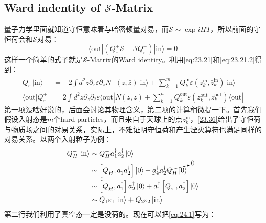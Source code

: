 \subsection{Ward indentity of $\mathcal{S}$\mbox{-}Matrix}
量子力学里面就知道守恒意味着与哈密顿量对易，而$\mathcal{S}\sim \exp{iHT}$，所以前面的守恒荷会和$\mathcal{S}$对易：
\begin{equation}\label{eq:24.1}
	\boxed{\langle\mathrm{out}|\left(Q_\varepsilon^+\mathcal{S}-\mathcal{S}Q_\varepsilon^-\right)|\mathrm{in}\rangle=0}
\end{equation}
这样一个简单的式子就是$\mathcal{S}$\mbox{-}Matrix的Ward identity。利用\ref{eq:23.21}和\ref{eq:23.21.2}得到：
\begin{equation}\label{eq:24.2}
	\begin{aligned}
		Q_\varepsilon^-|\mathrm{in}\rangle&=-2\int d^2z\partial_{\bar{z}}\varepsilon\partial_zN^-(z,\bar{z})|\mathrm{in}\rangle+\sum_{k=1}^mQ_k^\mathrm{in}\varepsilon(z_k^\mathrm{in},\bar{z}_k^\mathrm{in})|\mathrm{in}\rangle \\
		\langle\mathrm{out}|Q_\varepsilon^+&=2\int d^2z\partial_z\partial_{\bar{z}}\varepsilon\langle\mathrm{out}|N(z,\bar{z})+\sum_{k=1}^nQ_k^\mathrm{out}\varepsilon(z_k^\mathrm{out},\bar{z}_k^\mathrm{out})\langle\mathrm{out}|
	\end{aligned}
\end{equation}
第一项没啥好说的，后面会讨论其物理含义，第二项的计算稍微提一下。首先我们假设入射态是$m$个hard particles，而且来自于天球上的点$z_k^{\mathrm{in}}$，\ref{23.36}给出了守恒荷与物质场之间的对易关系，实际上，不难证明守恒荷和产生湮灭算符也满足同样的对易关系。以两个入射粒子为例：
\begin{equation}
	\begin{aligned}
		Q^-_{H}\ket{\text{in}}&\sim Q^-_{H}a_1^\dagger a_2^\dagger\ket{0}\\
		&\sim \left[Q^-_{H},a_1^\dagger a_2^\dagger\right]\ket{0}+\cancelto{0}{a_1^\dagger a_2^\dagger Q^-_{H}\ket{0}}\\
		&\sim  \left[Q^-_{H},a_1^\dagger \right]a_2^\dagger\ket{0}+a_1^\dagger\left[Q^-_{\varepsilon},a_2^\dagger \right]\ket{0}\\
		&\sim Q_1\varepsilon_1\ket{\text{in}}+Q_2\varepsilon_2\ket{\text{in}}
	\end{aligned}
\end{equation}
第二行我们利用了真空态一定是没荷的。现在可以把\ref{eq:24.1}写为：
